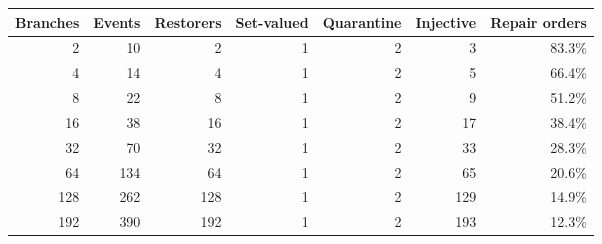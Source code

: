 \begin{tabular}{rrrrrrr}
\toprule
Branches & Events & Restorers & Set-valued & Quarantine & Injective & Repair orders\\
\midrule
2 & 10 & 2 & 1 & 2 & 3 & 83.3\%\\
4 & 14 & 4 & 1 & 2 & 5 & 66.4\%\\
8 & 22 & 8 & 1 & 2 & 9 & 51.2\%\\
16 & 38 & 16 & 1 & 2 & 17 & 38.4\%\\
32 & 70 & 32 & 1 & 2 & 33 & 28.3\%\\
64 & 134 & 64 & 1 & 2 & 65 & 20.6\%\\
128 & 262 & 128 & 1 & 2 & 129 & 14.9\%\\
192 & 390 & 192 & 1 & 2 & 193 & 12.3\%\\
\bottomrule
\end{tabular}

